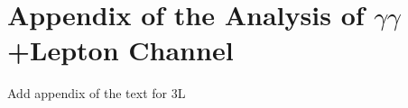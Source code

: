 \section{Appendix of the Analysis of $\gamma\gamma$+Lepton Channel }
\label{sec:AppAnaYYL}
Add appendix of the text for 3L


